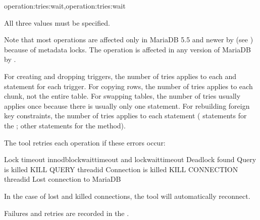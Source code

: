 \documentclass[letterpaper,10pt,english]{sphinxmanual}
\begin{document}
\begin{fulllineitems}
\begin{sphinxVerbatim}[commandchars=\\\{\}]
operation:tries:wait\PYG{o}{[},operation:tries:wait\PYG{o}{]}
\end{sphinxVerbatim}

\sphinxAtStartPar
All three values must be specified.

\sphinxAtStartPar
Note that most operations are affected only in MariaDB 5.5 and newer by
 (see {\hyperref[\detokenize{mariadb-schema-change:cmdoption-mariadb-schema-change-set-vars}]{}}) because of metadata locks.
The  operation is affected in any version of MariaDB by
.

\sphinxAtStartPar
For creating and dropping triggers, the number of tries applies to each
 and  statement for each trigger.
For copying rows, the number of tries applies to each chunk, not the
entire table.  For swapping tables, the number of tries usually applies
once because there is usually only one  statement.
For rebuilding foreign key constraints, the number of tries applies to
each statement ( statements for the 
{\hyperref[\detokenize{mariadb-schema-change:cmdoption-mariadb-schema-change-alter-foreign-keys-method}]{}}; other statements for the 
method).

\sphinxAtStartPar
The tool retries each operation if these errors occur:

\begin{sphinxVerbatim}[commandchars=\\\{\}]
Lock  timeout innodb\PYGZus{}lock\PYGZus{}wait\PYGZus{}timeout and lock\PYGZus{}wait\PYGZus{}timeout
Deadlock found
Query is killed KILL QUERY \PYGZlt{}thread\PYGZus{}id\PYGZgt{}
Connection is killed KILL CONNECTION \PYGZlt{}thread\PYGZus{}id\PYGZgt{}
Lost connection to MariaDB
\end{sphinxVerbatim}

\sphinxAtStartPar
In the case of lost and killed connections, the tool will automatically
reconnect.

\sphinxAtStartPar
Failures and retries are recorded in the {\hyperref[\detokenize{mariadb-schema-change:cmdoption-mariadb-schema-change-statistics}]{}}.

\end{fulllineitems}
\end{document}
